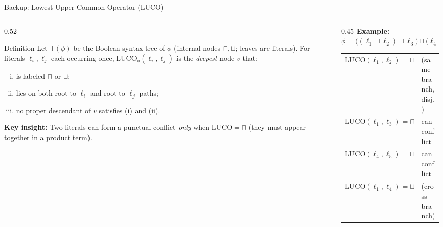 \documentclass[9pt,aspectratio=169]{beamer}
\newcommand{\LUCO}{\ensuremath{\mathrm{LUCO}}\xspace}
\begin{document}
\begin{frame}{Backup: Lowest Upper Common Operator (\LUCO)}
\small
\begin{columns}[T]
\begin{column}{0.52\textwidth}
  \begin{block}{Definition}
    Let $\mathsf{T}(\phi)$ be the Boolean syntax tree of $\phi$ (internal nodes $\sqcap,\sqcup$; leaves are literals).
    For literals $\ell_i,\ell_j$ each occurring once, $\LUCO_\phi(\ell_i,\ell_j)$ is the \emph{deepest} node $v$ that:
    \begin{enumerate}[(i)]
      \item is labeled $\sqcap$ or $\sqcup$;
      \item lies on both root-to-$\ell_i$ and root-to-$\ell_j$ paths;
      \item no proper descendant of $v$ satisfies (i) and (ii).
    \end{enumerate}
  \end{block}
  \medskip
  \textbf{Key insight:} Two literals can form a punctual conflict \emph{only} when $\LUCO = \sqcap$ (they must appear together in a product term).
\end{column}
\begin{column}{0.45\textwidth}
  \textbf{Example:} $\phi = \big((\ell_1 \sqcup \ell_2)\sqcap \ell_3\big)\sqcup\big(\ell_4 \sqcap \ell_5\big)$

  \begin{center}
  \end{center}

  \vspace{1mm}
  \footnotesize
  \renewcommand{\arraystretch}{1.15}
  \begin{tabular}{ll}
  $\LUCO(\ell_1,\ell_2)=\sqcup$ & (same branch, disj.)\\
  $\LUCO(\ell_1,\ell_3)=\sqcap$ & \textcolor{ConflictRed}{can conflict}\\
  $\LUCO(\ell_4,\ell_5)=\sqcap$ & \textcolor{ConflictRed}{can conflict}\\
  $\LUCO(\ell_1,\ell_4)=\sqcup$ & (cross-branch)\\
  \end{tabular}
\end{column}
\end{columns}


\end{frame}
\end{document}
